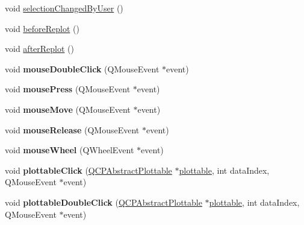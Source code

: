 \begin{DoxyCompactItemize}
\item 
void \hyperlink{class_q_custom_plot_a500c64a109bc773c973ad274f2fa4190}{selection\+Changed\+By\+User} ()
\item 
void \hyperlink{class_q_custom_plot_a0cd30e29b73efd6afe096e44bc5956f5}{before\+Replot} ()
\item 
void \hyperlink{class_q_custom_plot_a6f4fa624af060bc5919c5f266cf426a0}{after\+Replot} ()
\item 
void {\bfseries mouse\+Double\+Click} (Q\+Mouse\+Event $\ast$event)\hypertarget{class_q_custom_plot_a9b232142c64fcf273a953ee08e5b90e9}{}\label{class_q_custom_plot_a9b232142c64fcf273a953ee08e5b90e9}

\item 
void {\bfseries mouse\+Press} (Q\+Mouse\+Event $\ast$event)\hypertarget{class_q_custom_plot_aca75bf9afb5dd19349c375de2a87a051}{}\label{class_q_custom_plot_aca75bf9afb5dd19349c375de2a87a051}

\item 
void {\bfseries mouse\+Move} (Q\+Mouse\+Event $\ast$event)\hypertarget{class_q_custom_plot_a742ca4f94688bed2a685fd8a56ce5704}{}\label{class_q_custom_plot_a742ca4f94688bed2a685fd8a56ce5704}

\item 
void {\bfseries mouse\+Release} (Q\+Mouse\+Event $\ast$event)\hypertarget{class_q_custom_plot_ac8dc0ee6bb98e923c00b4ebafbe6134d}{}\label{class_q_custom_plot_ac8dc0ee6bb98e923c00b4ebafbe6134d}

\item 
void {\bfseries mouse\+Wheel} (Q\+Wheel\+Event $\ast$event)\hypertarget{class_q_custom_plot_ac80a14206f99304a91d2aa55775ec3ff}{}\label{class_q_custom_plot_ac80a14206f99304a91d2aa55775ec3ff}

\item 
void {\bfseries plottable\+Click} (\hyperlink{class_q_c_p_abstract_plottable}{Q\+C\+P\+Abstract\+Plottable} $\ast$\hyperlink{class_q_custom_plot_a32de81ff53e263e785b83b52ecd99d6f}{plottable}, int data\+Index, Q\+Mouse\+Event $\ast$event)\hypertarget{class_q_custom_plot_af5fe78b8bc9e4e96df921612837fd4fd}{}\label{class_q_custom_plot_af5fe78b8bc9e4e96df921612837fd4fd}

\item 
void {\bfseries plottable\+Double\+Click} (\hyperlink{class_q_c_p_abstract_plottable}{Q\+C\+P\+Abstract\+Plottable} $\ast$\hyperlink{class_q_custom_plot_a32de81ff53e263e785b83b52ecd99d6f}{plottable}, int data\+Index, Q\+Mouse\+Event $\ast$event)\hypertarget{class_q_custom_plot_a86a3ab7263c9c4e008e70d6c5fce9fbd}{}\label{class_q_custom_plot_a86a3ab7263c9c4e008e70d6c5fce9fbd}


\end{DoxyCompactItemize}
